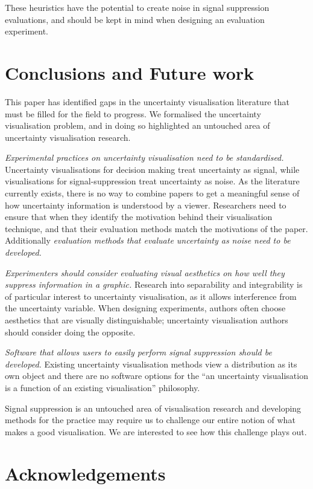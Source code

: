 \documentclass[
  12pt]{article}
\begin{document}
These heuristics have the potential to create noise in signal
suppression evaluations, and should be kept in mind when designing an
evaluation experiment.

\section{Conclusions and Future work}\label{conclusions-and-future-work}

This paper has identified gaps in the uncertainty visualisation
literature that must be filled for the field to progress. We formalised
the uncertainty visualisation problem, and in doing so highlighted an
untouched area of uncertainty visualisation research.

\emph{Experimental practices on uncertainty visualisation need to be
standardised.} Uncertainty visualisations for decision making treat
uncertainty as signal, while visualisations for signal-suppression treat
uncertainty as noise. As the literature currently exists, there is no
way to combine papers to get a meaningful sense of how uncertainty
information is understood by a viewer. Researchers need to ensure that
when they identify the motivation behind their visualisation technique,
and that their evaluation methods match the motivations of the paper.
Additionally \emph{evaluation methods that evaluate uncertainty as noise
need to be developed.}

\emph{Experimenters should consider evaluating visual aesthetics on how
well they suppress information in a graphic.} Research into separability
and integrability is of particular interest to uncertainty
visualisation, as it allows interference from the uncertainty variable.
When designing experiments, authors often choose aesthetics that are
visually distinguishable; uncertainty visualisation authors should
consider doing the opposite.

\emph{Software that allows users to easily perform signal suppression
should be developed.} Existing uncertainty visualisation methods view a
distribution as its own object and there are no software options for the
``an uncertainty visualisation is a function of an existing
visualisation'' philosophy.

Signal suppression is an untouched area of visualisation research and
developing methods for the practice may require us to challenge our
entire notion of what makes a good visualisation. We are interested to
see how this challenge plays out.

\section{Acknowledgements}\label{acknowledgements}
\end{document}
